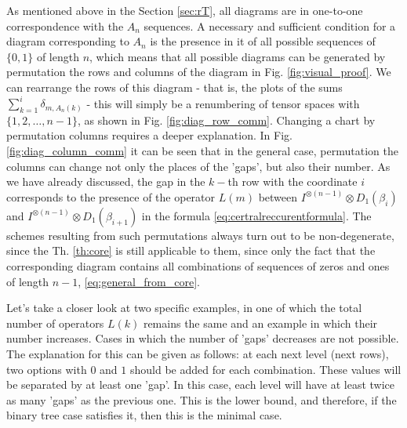 \documentclass[a4paper, openany, 12pt]{article}
\theoremstyle{remark}
\theoremstyle{definition}
\newcommand{\ot}{\otimes}
\begin{document}
As mentioned above in the Section \ref{sec:rT}, all diagrams are in one-to-one correspondence with the $A_n$ sequences. A necessary and sufficient condition for a diagram corresponding to $A_n$ is the presence in it of all possible sequences of $\{0,1\}$ of length $n$, which means that all possible diagrams can be generated by permutation the rows and columns of the diagram in Fig. \ref{fig:visual_proof}. We can rearrange the rows of this diagram - that is, the plots of the sums $\sum_{k=1}^i\delta_{m,A_n(k)}$ - this will simply be a renumbering of tensor spaces with $\{1,2,\dots,n-1\}$, as shown in Fig. \ref{fig:diag_row_comm}. Changing a chart by permutation columns requires a deeper explanation. In Fig. \ref{fig:diag_column_comm} it can be seen that in the general case, permutation the columns can change not only the places of the 'gaps', but also their number. As we have already discussed, the gap in the $k-$th row with the coordinate $i$ corresponds to the presence of the operator $L(m)$ between $I^{\ot(n-1)}\ot D_1(\beta_i)$ and $I^{\ot(n-1)}\ot D_1(\beta_{i+1})$ in the formula \eqref{eq:certralreccurentformula}. The schemes resulting from such permutations always turn out to be non-degenerate, since the Th. \ref{th:core} is still applicable to them, since only the fact that the corresponding diagram contains all combinations of sequences of zeros and ones of length $n-1$, \eqref{eq:general_from_core}.

Let's take a closer look at two specific examples, in one of which the total number of operators $L(k)$ remains the same and an example in which their number increases. Cases in which the number of 'gaps' decreases are not possible. The explanation for this can be given as follows: at each next level (next rows), two options with $0$ and $1$ should be added for each combination. These values will be separated by at least one 'gap'. In this case, each level will have at least twice as many 'gaps' as the previous one.  This is the lower bound, and therefore, if the binary tree case satisfies it, then this is the minimal case.
\end{document}
